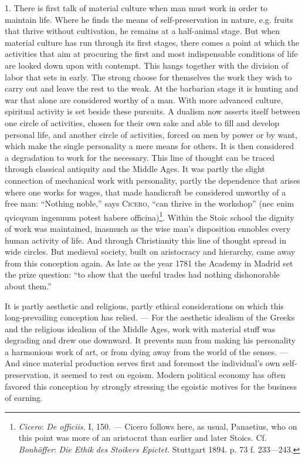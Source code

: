 \documentclass[12pt,a4paper,openany]{book}
\newcommand{\opage}[1]{\marginnote{\footnotesize\textit{[#1]}}}
\begin{document}
1. There is first talk of material culture when man must work in order to maintain life. Where he finds the means of
self-preservation in nature, e.g. fruits that thrive without cultivation, he remains at a half-animal stage. But when
material culture has run through its first stages, there comes a point at which the activities that aim at procuring the
first and most indispensable conditions of life are looked down upon with contempt. This hangs together with the division
of labor that sets in early. The strong choose for themselves the work they wish to carry out and leave the rest to the
weak. At the barbarian stage it is hunting and war that alone are considered worthy of a man.
\opage{359}With more advanced culture, spiritual activity is set beside these pursuits. A dualism now asserts itself
between one circle of activities, chosen for their own sake and able to fill and develop personal life, and another
circle of activities, forced on men by power or by want, which make the single personality a mere means for others. It is
then considered a degradation to work for the necessary. This line of thought can be traced through classical antiquity
and the Middle Ages. It was partly the slight connection of mechanical work with personality, partly the dependence that
arises where one works for wages, that made handicraft be considered unworthy of a free man: ``Nothing noble,'' says
\textsc{Cicero}, ``can thrive in the workshop'' (nec enim qvicqvam ingenuum potest habere officina)\footnote[1]{\emph{Cicero}:
\textit{De officiis.} I, 150. --- Cicero follows here, as usual, Panaetius, who on this point was more of an
aristocrat than earlier and later Stoics. Cf. \emph{Bonhöffer}: \textit{Die Ethik des Stoikers Epictet.} Stuttgart 1894.
p. 73 f. 233---243.}. Within the Stoic school the dignity of work was maintained, inasmuch as the wise man's disposition
ennobles every human activity of life. And through Christianity this line of thought spread in wide circles. But medieval
society, built on aristocracy and hierarchy, came away from this conception again. As late as the year 1781 the Academy in
Madrid set the prize question: ``to show that the useful trades had nothing dishonorable about them.''

It is partly aesthetic and religious, partly ethical considerations on which this long-prevailing conception has relied.
--- For the aesthetic idealism of the Greeks and the religious idealism of the Middle Ages, work with material stuff was
degrading and drew one downward. It prevents man from making his personality a harmonious work of art, or from dying away
from the world of the senses. --- And since material production serves first and foremost the individual's own
self-preservation, it seemed to rest on egoism. Modern political economy has often favored this conception by strongly
stressing the egoistic motives for the business of earning.
\end{document}
